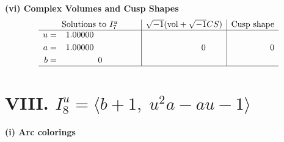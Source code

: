 \documentclass[1p]{elsarticle_modified}
\theoremstyle{definition}
\newcommand{\I}{\sqrt{-1}}
\begin{document}
\newpage\flushleft \textbf{(vi) Complex Volumes and Cusp Shapes}
$$\begin{array}{c|c|c}  
\text{Solutions to }I^u_{7}& \I (\text{vol} + \sqrt{-1}CS) & \text{Cusp shape}\\
 \hline 
\begin{aligned}
u &= \phantom{-}1.00000\phantom{ +0.000000I} \\
a &= \phantom{-}1.00000\phantom{ +0.000000I} \\
b &= \phantom{-0.000000 } 0\end{aligned}
 & \phantom{-0.000000 } 0 & \phantom{-0.000000 } 0\\
 \hline 
 \end{array}$$\newpage\newpage\renewcommand{\arraystretch}{1}
\centering \section*{VIII. $I^u_{8}= \langle b+1,\;u^2 a- a u-1 \rangle$}
\flushleft \textbf{(i) Arc colorings}\\
\end{document}
